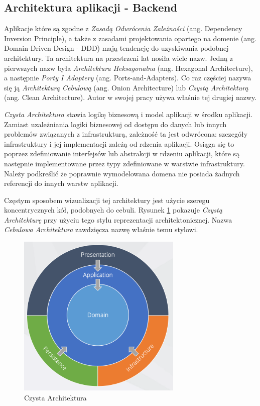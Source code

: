 \documentclass[12pt]{article}
\numberwithin{figure}{section}
\begin{document}
\begin{sloppypar}
\subsection{Architektura aplikacji - Backend}
    
Aplikacje które są zgodne z \textit{Zasadą Odwrócenia Zależności} (ang. Dependency Inversion Principle), a także z zasadami projektowania opartego na domenie (ang. Domain-Driven Design - DDD) mają tendencję do uzyskiwania podobnej architektury. Ta architektura na przestrzeni lat nosiła wiele nazw. Jedną z pierwszych nazw była \textit{Architektura Heksagonalna} (ang. Hexagonal Architecture), a następnie \textit{Porty I Adaptery} (ang. Ports-and-Adapters). Co raz częściej nazywa się ją \textit{Architekturą Cebulową} (ang. Onion Architecture) lub \textit{Czystą Architekturą} (ang. Clean Architecture). Autor w swojej pracy używa właśnie tej drugiej nazwy.
    
\textit{Czysta Architektura} stawia logikę biznesową i model aplikacji w środku aplikacji. Zamiast uzależniania logiki biznesowej od dostępu do danych lub innych problemów związanych z infrastrukturą, zależność ta jest odwrócona: szczegóły infrastruktury i jej implementacji zależą od rdzenia aplikacji. Osiąga się to poprzez zdefiniowanie interfejsów lub abstrakcji w rdzeniu aplikacji, które są następnie implementowane przez typy zdefiniowane w warstwie infrastruktury. Należy podkreślić że poprawnie wymodelowana domena nie posiada żadnych referencji do innych warstw aplikacji.
    
Częstym sposobem wizualizacji tej architektury jest użycie szeregu koncentrycznych kół, podobnych do cebuli. Rysunek \ref{fig:clean-architecture} pokazuje \textit{Czystą Architekturę} przy użyciu tego stylu reprezentacji architektonicznej. Nazwa \textit{Cebulowa Architektura} zawdzięcza nazwę właśnie temu stylowi. 
    
\begin{figure}[H] 
    \centering
    \includegraphics[width=0.7\textwidth]{images/chapter_3/clean-architecture.png}
    \caption{Czysta Architektura \cite{clean-architecture}}
    \label{fig:clean-architecture}
\end{figure}
    

\end{sloppypar}
\end{document}
